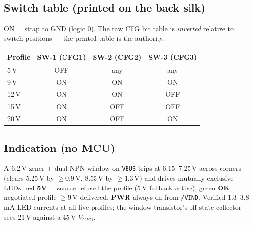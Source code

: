 \documentclass[11pt,a4paper]{article}
\newcommand{\net}[1]{\texttt{#1}}
\begin{document}
\subsection{Switch table (printed on the back silk)}
ON = strap to GND (logic 0). The raw CFG bit table is \emph{inverted}
relative to switch positions --- the printed table is the authority:

\begin{center}
\begin{tabular}{@{}lccc@{}}
\toprule
Profile & SW-1 (CFG1) & SW-2 (CFG2) & SW-3 (CFG3)\\
\midrule
5\,V  & OFF & any & any\\
9\,V  & ON & ON & ON\\
12\,V & ON & ON & OFF\\
15\,V & ON & OFF & OFF\\
20\,V & ON & OFF & ON\\
\bottomrule
\end{tabular}
\end{center}

\subsection{Indication (no MCU)}
A 6.2\,V zener + dual-NPN window on \net{VBUS} trips at 6.15--7.25\,V
across corners (clears 5.25\,V by $\geq$0.9\,V, 8.55\,V by $\geq$1.3\,V)
and drives mutually-exclusive LEDs: red \textbf{5V} = source refused the
profile (5\,V fallback active), green \textbf{OK} = negotiated profile
$\geq$9\,V delivered. \textbf{PWR} always-on from \net{/VIND}. Verified
1.3--3.8\,mA LED currents at all five profiles; the window transistor's
off-state collector sees 21\,V against a 45\,V $V_{CEO}$.
\end{document}
